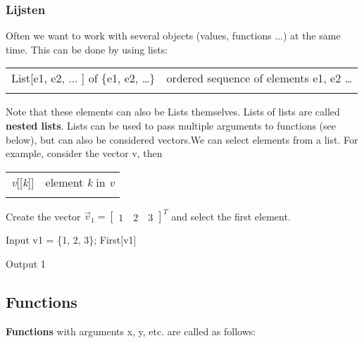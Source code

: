 \subsubsection{Lijsten}
Often we want to work with several objects (values, functions ...) at the same time. This can be done by using lists:

\begin{tabular}{>{\hfill}p{6cm}p{11cm}}
	List[e1, e2, ... ] of $\{$e1, e2, \ldots$\}$			&	ordered sequence of elements e1, e2 \ldots\\
	\multicolumn{2}{l}{} 
\end{tabular}

Note that these elements can also be Lists themselves. Lists of lists are called \textbf{nested lists}. Lists can be used to pass multiple arguments to functions (see below), but can also be considered vectors.We can select elements from a list. For example, consider the vector v, then 

\begin{tabular}{>{\hfill}p{6cm}p{11cm}}
	\textit{v}[[\textit{k}]]		&		element \textit{k} in \textit{v} \\
	\multicolumn{2}{l}{} 
\end{tabular}


\begin{example}

Create the vector $\vec{v}_1=\begin{bmatrix}1\quad2\quad3\end{bmatrix}^T$ and select the first element.
	
\begin{mdframed}[default,backgroundcolor=gray!40,roundcorner=8pt]
	\begin{mmaCell}[]{Input}
		v1 = \{1, 2, 3\};
		First[v1]
	\end{mmaCell}
	\begin{mmaCell}[]{Output}
		1
	\end{mmaCell}
\end{mdframed}
\end{example}

\subsection{Functions}
\textbf{Functions} with arguments x, y, etc. are called as follows:

